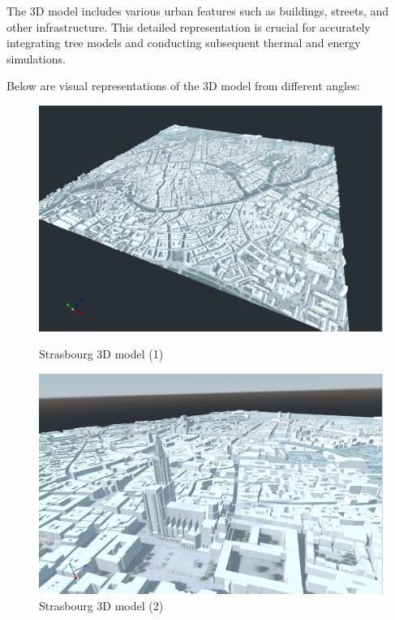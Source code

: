 \documentclass[12pt]{article}
\begin{document}
The 3D model includes various urban features such as buildings, streets, and
other infrastructure. This detailed representation is crucial for accurately
integrating tree models and conducting subsequent thermal and energy simulations.

Below are visual representations of the 3D model from different angles:

\begin{figure}[H]
    \centering
    \begin{minipage}{0.45\textwidth}
        \centering
        \includegraphics[width=1\textwidth]{images/strasbourg-mesh-1.png}
        \caption{Strasbourg 3D model (1)}
    \end{minipage}
    \begin{minipage}{0.45\textwidth}
        \centering
        \includegraphics[width=1\textwidth]{images/strasbourg-mesh-2.png}
        \caption{Strasbourg 3D model (2)}
    \end{minipage}
\end{figure}
\end{document}
